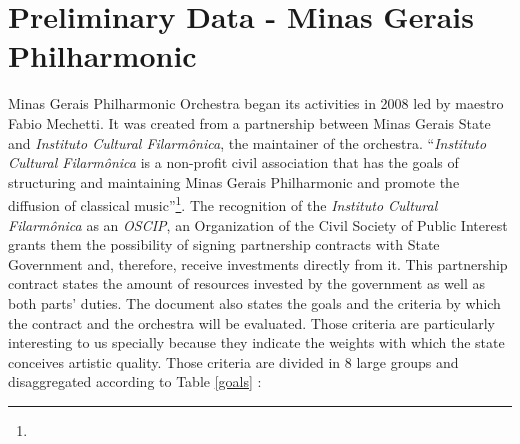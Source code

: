 \documentclass[a4paper, 12pt, openright, oneside, german, french, brazil, english]{abntex2}
\begin{document}
        
        \chapter[Preliminary Data]{Preliminary Data - Minas Gerais Philharmonic}

        Minas Gerais Philharmonic Orchestra began its activities in 2008 led by maestro Fabio Mechetti. It was created from a partnership between Minas Gerais State and \textit{Instituto Cultural Filarmônica}, the maintainer of the orchestra. ``\textit{Instituto Cultural Filarmônica} is a non-profit civil association that has the goals of structuring and maintaining Minas Gerais Philharmonic and promote the diffusion of classical music''\footnote{}.
        The recognition of the \textit{Instituto Cultural Filarmônica} as an \textit{OSCIP}, an Organization of the Civil Society of Public Interest grants them the possibility of signing partnership contracts \cite{minas2017aditivo} with State Government and, therefore, receive investments directly from it. This partnership contract states the amount of resources invested by the government as well as both parts' duties. The document also states the goals and the criteria by which the contract and the orchestra will be evaluated. Those criteria are particularly interesting to us specially because they indicate the weights with which the state conceives artistic quality. Those criteria are divided in 8 large groups and disaggregated according to Table \ref{goals} \cite{filarmonica2017gerencial}:
\end{document}
